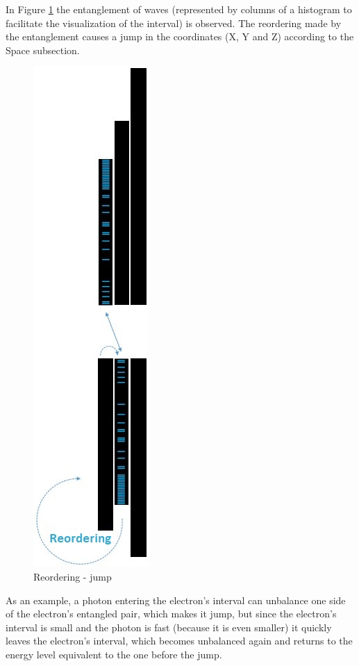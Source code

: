 In Figure \ref{fig:consciousness_space_subconscious_observation_jump} the entanglement of waves (represented by columns of a histogram to facilitate the visualization of the interval) is observed. The reordering made by the entanglement causes a jump in the coordinates (X, Y and Z) according to the Space subsection.
	\begin{figure}[H]
	\caption{Reordering - jump}
	\label{fig:consciousness_space_subconscious_observation_jump}
	\centering
	\includegraphics[scale=.53]{sections/images/consciousness_space_subconscious_observation_jump.jpg}
	\end{figure}

As an example, a photon entering the electron's interval can unbalance one side of the electron's entangled pair, which makes it jump, but since the electron's interval is small and the photon is fast (because it is even smaller) it quickly leaves the electron's interval, which becomes unbalanced again and returns to the energy level equivalent to the one before the jump.

